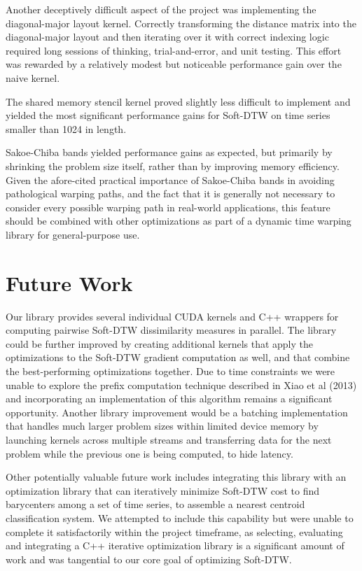 \documentclass[12pt, letterpaper]{article}
\begin{document}
Another deceptively difficult aspect of the project was implementing the
diagonal-major layout kernel. Correctly transforming the distance matrix into
the diagonal-major layout and then iterating over it with correct indexing logic
required long sessions of thinking, trial-and-error, and unit testing. This
effort was rewarded by a relatively modest but noticeable performance gain over
the naive kernel.

The shared memory stencil kernel proved slightly less difficult to implement and
yielded the most significant performance gains for Soft-DTW on time series
smaller than 1024 in length.

Sakoe-Chiba bands yielded performance gains as expected, but primarily by
shrinking the problem size itself, rather than by improving memory efficiency.
Given the afore-cited practical importance of Sakoe-Chiba bands in avoiding
pathological warping paths, and the fact that it is generally not necessary to
consider every possible warping path in real-world applications, this feature
should be combined with other optimizations as part of a dynamic time warping
library for general-purpose use.

\section{Future Work}

Our library provides several individual CUDA kernels and C++ wrappers for
computing pairwise Soft-DTW dissimilarity measures in parallel. The library
could be further improved by creating additional kernels that apply the
optimizations to the Soft-DTW gradient computation as well, and that combine the
best-performing optimizations together. Due to time constraints we were unable
to explore the prefix computation technique described in Xiao et al (2013)
\cite{xiao_parallelizing_2013} and incorporating an implementation of this
algorithm remains a significant opportunity. Another library improvement would
be a batching implementation that handles much larger problem sizes within
limited device memory by launching kernels across multiple streams and
transferring data for the next problem while the previous one is being computed,
to hide latency.

Other potentially valuable future work includes integrating this library with an
optimization library that can iteratively minimize Soft-DTW cost to find
barycenters among a set of time series, to assemble a nearest centroid
classification system. We attempted to include this capability but were unable
to complete it satisfactorily within the project timeframe, as selecting,
evaluating and integrating a C++ iterative optimization library is a significant
amount of work and was tangential to our core goal of optimizing Soft-DTW.
\end{document}

